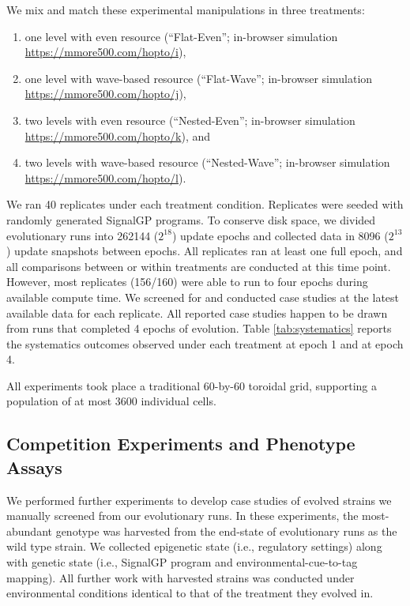 We mix and match these experimental manipulations in three treatments:
\begin{enumerate}
\item one level with even resource (``Flat-Even''; in-browser simulation \url{https://mmore500.com/hopto/i}),
\item one level with wave-based resource (``Flat-Wave''; in-browser simulation \url{https://mmore500.com/hopto/j}),
\item two levels with even resource (``Nested-Even''; in-browser simulation \url{https://mmore500.com/hopto/k}), and
\item two levels with wave-based resource (``Nested-Wave''; in-browser simulation \url{https://mmore500.com/hopto/l}).
\end{enumerate}

We ran 40 replicates under each treatment condition.
Replicates were seeded with randomly generated SignalGP programs.
To conserve disk space, we divided evolutionary runs into 262144 ($2^{18}$) update epochs and collected data in 8096 ($2^{13}$) update snapshots between epochs.
All replicates ran at least one full epoch, and all comparisons between or within treatments are conducted at this time point.
However, most replicates (156/160) were able to run to four epochs during available compute time.
We screened for and conducted case studies at the latest available data for each replicate.
All reported case studies happen to be drawn from runs that completed 4 epochs of evolution.
Table \ref{tab:systematics} reports the systematics outcomes observed under each treatment at epoch 1 and at epoch 4.

All experiments took place a traditional 60-by-60 toroidal grid, supporting a population of at most 3600 individual cells.

\subsection{Competition Experiments and Phenotype Assays} \label{sup:competition_assays}

We performed further experiments to develop case studies of evolved strains we manually screened from our evolutionary runs.
In these experiments, the most-abundant genotype was harvested from the end-state of evolutionary runs as the wild type strain.
We collected epigenetic state (i.e., regulatory settings) along with genetic state (i.e., SignalGP program and environmental-cue-to-tag mapping).
All further work with harvested strains was conducted under environmental conditions identical to that of the treatment they evolved in.

